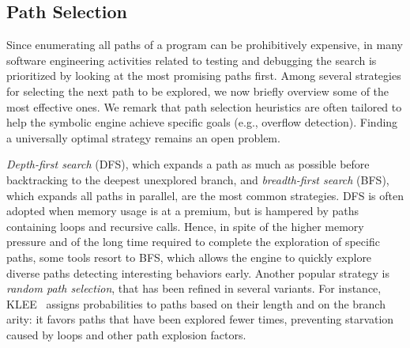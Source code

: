 \subsection{Path Selection}
\label{ss:heuristics}

Since enumerating all paths of a program can be prohibitively expensive, in many software engineering activities related to testing and debugging the search is prioritized by looking at the most promising paths first. Among several strategies for selecting the next path to be explored, we now briefly overview some of the most effective ones. %
%
We remark that path selection heuristics are often tailored to help the symbolic engine achieve specific goals (e.g., overflow detection). Finding a universally optimal strategy remains an open problem.

{\em Depth-first search} (DFS), which expands a path as much as possible before backtracking to the deepest unexplored branch, and {\em breadth-first search} (BFS), which expands all paths in parallel, are the most common strategies. DFS is often adopted when memory usage is at a premium, but is hampered by paths containing loops and recursive calls. Hence,  in spite of the higher memory pressure and of the long time required to complete the exploration of specific paths, some tools resort to BFS, which allows the engine to quickly explore diverse paths  detecting interesting behaviors early.
Another popular strategy is {\em random path selection}, that has been refined in several variants. For instance, {\textsc KLEE}~\cite{KLEE-OSDI08} assigns probabilities to paths based on their length and on the branch arity: it favors paths that have been explored fewer times, preventing starvation caused by loops and other path explosion factors.

